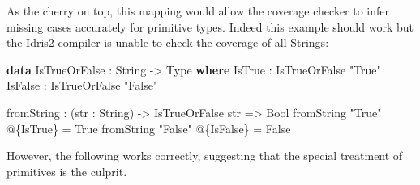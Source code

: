 \documentclass[
]{article}
\newenvironment{Shaded}{}{}
\newcommand{\DataTypeTok}[1]{\textcolor[rgb]{0.56,0.13,0.00}{#1}}
\newcommand{\KeywordTok}[1]{\textcolor[rgb]{0.00,0.44,0.13}{\textbf{#1}}}
\newcommand{\NormalTok}[1]{#1}
\newcommand{\OperatorTok}[1]{\textcolor[rgb]{0.40,0.40,0.40}{#1}}
\newcommand{\OtherTok}[1]{\textcolor[rgb]{0.00,0.44,0.13}{#1}}
\newcommand{\StringTok}[1]{\textcolor[rgb]{0.25,0.44,0.63}{#1}}
\begin{document}
As the cherry on top, this mapping would allow the coverage checker to
infer missing cases accurately for primitive types. Indeed this example
should work but the Idris2 compiler is unable to check the coverage of
all Strings:

\begin{Shaded}
\begin{Highlighting}[]
\KeywordTok{data} \DataTypeTok{IsTrueOrFalse} \OperatorTok{:} \DataTypeTok{String} \OtherTok{{-}\textgreater{}} \DataTypeTok{Type} \KeywordTok{where}
  \DataTypeTok{IsTrue} \OperatorTok{:} \DataTypeTok{IsTrueOrFalse} \StringTok{"True"}
  \DataTypeTok{IsFalse} \OperatorTok{:} \DataTypeTok{IsTrueOrFalse} \StringTok{"False"}

\NormalTok{fromString }\OperatorTok{:}\NormalTok{ (str }\OperatorTok{:} \DataTypeTok{String}\NormalTok{) }\OtherTok{{-}\textgreater{}} \DataTypeTok{IsTrueOrFalse}\NormalTok{ str }\OtherTok{=\textgreater{}} \DataTypeTok{Bool}
\NormalTok{fromString }\StringTok{"True"} \OperatorTok{@}\NormalTok{\{}\DataTypeTok{IsTrue}\NormalTok{\} }\OtherTok{=} \DataTypeTok{True}
\NormalTok{fromString }\StringTok{"False"} \OperatorTok{@}\NormalTok{\{}\DataTypeTok{IsFalse}\NormalTok{\} }\OtherTok{=} \DataTypeTok{False}
\end{Highlighting}
\end{Shaded}

However, the following works correctly, suggesting that the special
treatment of primitives is the culprit.
\end{document}
